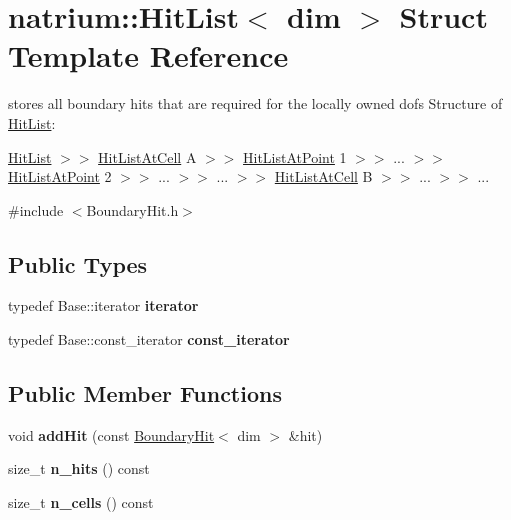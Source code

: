 \hypertarget{structnatrium_1_1HitList}{
\section{natrium::HitList$<$ dim $>$ Struct Template Reference}
\label{structnatrium_1_1HitList}
}


stores all boundary hits that are required for the locally owned dofs Structure of \hyperlink{structnatrium_1_1HitList}{HitList}:
\begin{DoxyItemize}
\item \hyperlink{structnatrium_1_1HitList}{HitList} $>$$>$ \hyperlink{structnatrium_1_1HitListAtCell}{HitListAtCell} A $>$$>$ \hyperlink{structnatrium_1_1HitListAtPoint}{HitListAtPoint} 1 $>$$>$ ... $>$$>$ \hyperlink{structnatrium_1_1HitListAtPoint}{HitListAtPoint} 2 $>$$>$ ... $>$$>$ ... $>$$>$ \hyperlink{structnatrium_1_1HitListAtCell}{HitListAtCell} B $>$$>$ ... $>$$>$ ... 
\end{DoxyItemize} 


{\ttfamily \#include $<$BoundaryHit.h$>$}\subsection*{Public Types}
\begin{DoxyCompactItemize}
\item 
\hypertarget{structnatrium_1_1HitList_a89f232c16ffe68afb8e654cd1827d206}{
typedef Base::iterator {\bfseries iterator}}
\label{structnatrium_1_1HitList_a89f232c16ffe68afb8e654cd1827d206}

\item 
\hypertarget{structnatrium_1_1HitList_a071a4ba91f009ded8a789ee228fc9741}{
typedef Base::const\_\-iterator {\bfseries const\_\-iterator}}
\label{structnatrium_1_1HitList_a071a4ba91f009ded8a789ee228fc9741}

\end{DoxyCompactItemize}
\subsection*{Public Member Functions}
\begin{DoxyCompactItemize}
\item 
\hypertarget{structnatrium_1_1HitList_ad409882e8650f2a2975554ca6739f35e}{
void {\bfseries addHit} (const \hyperlink{structnatrium_1_1BoundaryHit}{BoundaryHit}$<$ dim $>$ \&hit)}
\label{structnatrium_1_1HitList_ad409882e8650f2a2975554ca6739f35e}

\item 
\hypertarget{structnatrium_1_1HitList_aaeabd78604239f7e58ca91fdd68c3cfc}{
size\_\-t {\bfseries n\_\-hits} () const }
\label{structnatrium_1_1HitList_aaeabd78604239f7e58ca91fdd68c3cfc}

\item 
\hypertarget{structnatrium_1_1HitList_ac088ae0bbfa85efdeff0c81380489874}{
size\_\-t {\bfseries n\_\-cells} () const }
\label{structnatrium_1_1HitList_ac088ae0bbfa85efdeff0c81380489874}

\end{DoxyCompactItemize}


